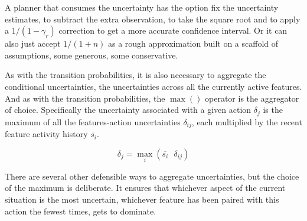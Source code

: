 A planner that consumes the uncertainty has the option fix the uncertainty
estimates, to subtract the extra observation, to take the square root
and to apply a $1 / (1 - \gamma_r)$  correction
to get a more accurate confidence interval. Or it can also just accept $1 / (1 + n)$
as a rough approximation built on a scaffold of assumptions,
some generous, some conservative.

As with the transition probabilities, it is also necessary to aggregate the
conditional uncertainties, the uncertainties across
all the currently active features.
And as with the transition probabilities, the $\max()$ operator is the 
aggregator of choice. Specifically the uncertainty associated with a given
action $\delta_j$ is the maximum of all the features-action uncertainties
$\delta_{ij}$, each multiplied
by the recent feature activity history $\overline{s_i}$.

\begin{equation}
\delta_j = \max_i (\overline{s_i} \mbox{ } \delta_{ij})
\end{equation}

There are several other defensible ways to aggregate uncertainties,
but the choice of the maximum is deliberate. It ensures that whichever
aspect of the current situation is the most uncertain,
whichever feature has been paired
with this action the fewest times, gets to dominate.
